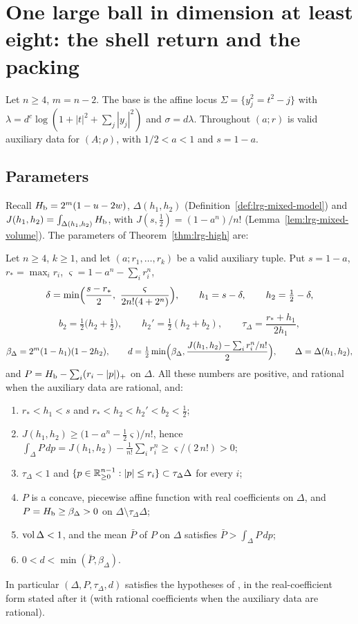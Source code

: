 \section{One large ball in dimension at least eight: the shell return and the packing}\label{sec:two}

Let $n\ge4$, $m=n-2$. The base is the affine locus $\Sigma=\{y_j^2=t^2-j\}$ with
$\lambda=d^c\log(1+|t|^2+\sum_j|y_j|^2)$ and $\sigma=d\lambda$. Throughout $(a;r)$ is valid auxiliary data for
$(A;\rho)$, with $1/2<a<1$ and $s=1-a$.

\subsection{Parameters}\label{sec:two-parameters}

Recall $H_{\mathrm b}=2^m(1-u-2w)$, $\Delta(h_1,h_2)$ (Definition~\ref{def:lrg-mixed-model}) and $J(h_1,h_2)=\int_{\Delta(h_1,h_2)}H_{\mathrm b}$,
with $J(s,\frac12)=(1-a^n)/n!$ (Lemma~\ref{lem:lrg-mixed-volume}). The parameters of Theorem~\ref{thm:lrg-high} are:

\begin{lemma}\label{lem:two-parameters}
Let $n\ge4$, $k\ge1$, and let $(a;r_1,\dots,r_k)$ be a valid auxiliary tuple. Put $s=1-a$, $r_*=\max_ir_i$,
$\varsigma=1-a^n-\sum_ir_i^n$,
\[
 \delta=\min\Bigl(\frac{s-r_*}2,\ \frac{\varsigma}{2n!(4+2^n)}\Bigr),\qquad
 h_1=s-\delta,\qquad h_2=\tfrac12-\delta,
\]
\[
 b_2=\tfrac12\bigl(h_2+\tfrac12\bigr),\qquad h_2'=\tfrac12(h_2+b_2),\qquad
 \tau_\Delta=\frac{r_*+h_1}{2h_1},
\]
\[
 \beta_\Delta=2^m(1-h_1)(1-2h_2),\qquad
 d=\tfrac12\min\Bigl(\beta_\Delta,\frac{J(h_1,h_2)-\sum_i r_i^n/n!}{2}\Bigr),\qquad \Delta=\Delta(h_1,h_2),
\]
and $P=H_{\mathrm b}-\sum_i(r_i-|p|)_+$ on $\Delta$. All these numbers are positive, and rational when the auxiliary data are rational, and:
\begin{enumerate}[label=(\roman*)]
\item $r_*<h_1<s$ and $r_*<h_2<h_2'<b_2<\frac12$;
\item $J(h_1,h_2)\ge\bigl(1-a^n-\frac12\varsigma\bigr)/n!$, hence $\int_\Delta P\,dp=J(h_1,h_2)-\frac1{n!}\sum_ir_i^n\ge\varsigma/(2\,n!)>0$;
\item $\tau_\Delta<1$ and $\{p\in\mathbb{R}^{n-1}_{\ge0}:|p|\le r_i\}\subset\tau_\Delta\Delta$ for every $i$;
\item $P$ is a concave, piecewise affine function with real coefficients on $\Delta$, and $P=H_{\mathrm b}\ge\beta_\Delta>0$ on $\Delta\setminus\tau_\Delta\Delta$;
\item $\operatorname{vol}\Delta<1$, and the mean $\bar P$ of $P$ on $\Delta$ satisfies $\bar P>\int_\Delta P\,dp$;
\item $0<d<\min(\bar P,\beta_\Delta)$.
\end{enumerate}
In particular $(\Delta,P,\tau_\Delta,d)$ satisfies the hypotheses of , in the
real-coefficient form stated after it (with rational coefficients when the auxiliary data are rational).
\end{lemma}

